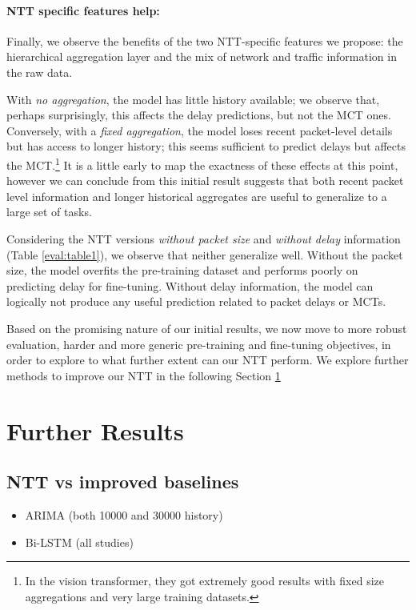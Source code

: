 \paragraph*{NTT specific features help:}
Finally, we observe the benefits of the two NTT-specific features we propose: \ie the hierarchical aggregation layer and the mix of network and traffic information in the raw data.

With \emph{no aggregation}, the model has little history available; we observe that, perhaps surprisingly, this affects the delay predictions, but not the MCT ones. Conversely, with a \emph{fixed aggregation}, the model loses recent packet-level details but has access to longer history; this seems sufficient to predict delays but affects the MCT.\footnote{In the vision transformer\cite{dosovitskiyImageWorth16x162021}, they got extremely good results with fixed size aggregations and very large training datasets.}
It is a little early to map the exactness of these effects at this point, however we can conclude from this initial result suggests that both recent packet level information and longer historical aggregates are useful to generalize to a large set of tasks.


Considering the NTT versions \emph{without packet size} and \emph{without delay} information (Table \ref{eval:table1}), we observe that neither generalize well.
Without the packet size, the model overfits the pre-training dataset and performs poorly on predicting delay for fine-tuning.
Without delay information, the model can logically not produce any useful prediction related to packet delays or MCTs.


Based on the promising nature of our initial results, we now move to more robust evaluation, harder and more generic pre-training and fine-tuning objectives, in order to explore to what further extent can our NTT perform. We explore further methods to improve our NTT in the following Section \ref{eval:fres}


\section{Further Results}
\label{eval:fres}

\subsection{NTT vs improved baselines}
\label{ssec:impbase}

\begin{itemize}
\item ARIMA (both 10000 and 30000 history)
\item Bi-LSTM (all studies)
\end{itemize}

